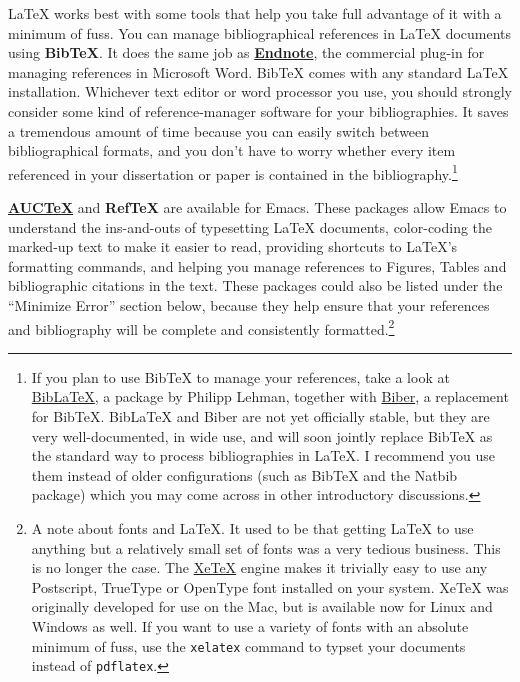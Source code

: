 \documentclass[11pt,article,oneside]{memoir}
\begin{document}
\LaTeX{} works best with some tools that help you take full advantage
of it with a minimum of fuss. You can manage bibliographical
references in \LaTeX{} documents using \textbf{BibTeX}. It does the
same job as \textbf{\href{http://www.endnote.com/}{Endnote}}, the
commercial plug-in for managing references in Microsoft Word. BibTeX
comes with any standard \LaTeX{} installation. Whichever text editor
or word processor you use, you should strongly consider some kind of
reference-manager software for your bibliographies. It saves a
tremendous amount of time because you can easily switch between
bibliographical formats, and you don't have to worry whether every
item referenced in your dissertation or paper is contained in the
bibliography.\footnote{If you plan to use BibTeX to manage your
  references, take a look at
  \href{http://www.ctan.org/tex-archive/help/Catalogue/entries/biblatex.html}{BibLaTeX},
  a package by Philipp Lehman, together with
  \href{http://biblatex-biber.sourceforge.net/}{Biber}, a replacement
  for BibTeX. BibLaTeX and Biber are not yet officially stable, but
  they are very well-documented, in wide use, and will soon jointly
  replace BibTeX as the standard way to process bibliographies in
  \LaTeX{}. I recommend you use them instead of older configurations
  (such as BibTeX and the Natbib package) which you may come across in
  other introductory discussions. }

\textbf{\href{http://www.gnu.org/software/auctex/}{AUCTeX}} and
\textbf{RefTeX} are available for Emacs. These packages allow Emacs to
understand the ins-and-outs of typesetting \LaTeX{} documents,
color-coding the marked-up text to make it easier to read, providing
shortcuts to LaTeX's formatting commands, and helping you manage
references to Figures, Tables and bibliographic citations in the
text. These packages could also be listed under the ``Minimize Error''
section below, because they help ensure that your references and
bibliography will be complete and consistently formatted.\footnote{A
  note about fonts and \LaTeX{}. It used to be that getting \LaTeX{}
  to use anything but a relatively small set of fonts was a very
  tedious business. This is no longer the case. The
  \href{http://scripts.sil.org/cms/scripts/page.php?site_id=nrsi&id=xetex}{XeTeX}
  engine makes it trivially easy to use any Postscript, TrueType or
  OpenType font installed on your system. XeTeX was originally
  developed for use on the Mac, but is available now for Linux and
  Windows as well. If you want to use a variety of fonts with an
  absolute minimum of fuss, use the \texttt{xelatex} command to typset
  your documents instead of \texttt{pdflatex}. }
\end{document}
